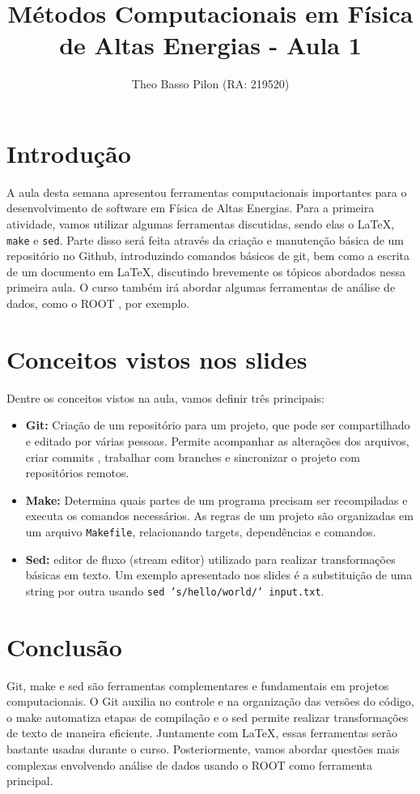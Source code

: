 \documentclass[12pt,a4paper]{article}
\title{Métodos Computacionais em Física de Altas Energias - Aula 1}
\author{Theo Basso Pilon (RA: 219520)}
\date{}
\begin{document}
\maketitle

\section{Introdução}

A aula desta semana apresentou ferramentas computacionais importantes para o desenvolvimento de software em Física de Altas Energias. Para a primeira atividade, vamos utilizar algumas ferramentas discutidas, sendo elas o \LaTeX, \texttt{make} e \texttt{sed}. Parte disso será feita através da criação e manutenção básica de um repositório no Github, introduzindo comandos básicos de git, bem como a escrita de um documento em \LaTeX, discutindo brevemente os tópicos abordados nessa primeira aula. O curso também irá abordar algumas ferramentas de análise de dados, como o ROOT \cite{Brun:1997pa}, por exemplo. 


\section{Conceitos vistos nos slides}

Dentre os conceitos vistos na aula, vamos definir três principais:

\begin{itemize}
    \item \textbf{Git:} Criação de um repositório para um projeto, que pode ser compartilhado e editado por várias pessoas. Permite acompanhar as alterações dos arquivos, criar commits , trabalhar com branches e sincronizar o projeto com repositórios remotos.
    \item \textbf{Make:} Determina quais partes de um programa precisam ser recompiladas e executa os comandos necessários. As regras de um projeto são organizadas em um arquivo \texttt{Makefile}, relacionando targets, dependências e comandos.
    \item \textbf{Sed:} editor de fluxo (stream editor) utilizado para realizar transformações básicas em texto. Um exemplo apresentado nos slides é a substituição de uma string por outra usando \texttt{sed 's/hello/world/' input.txt}.
\end{itemize}


\section{Conclusão}

Git, make e sed são ferramentas complementares e fundamentais em projetos computacionais. O Git auxilia no controle e na organização das versões do código, o make automatiza etapas de compilação e o sed permite realizar transformações de texto de maneira eficiente. Juntamente com \LaTeX{}, essas ferramentas serão bastante usadas durante o curso. Posteriormente, vamos abordar questões mais complexas envolvendo análise de dados usando o ROOT como ferramenta principal.



\end{document}
